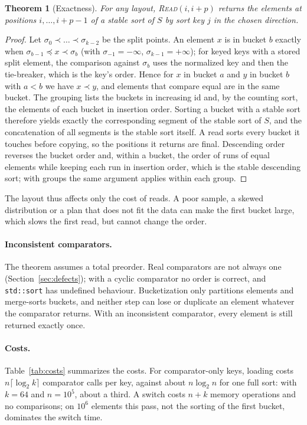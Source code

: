 \documentclass[11pt]{article}
\newtheorem{theorem}{Theorem}
\theoremstyle{definition}
\begin{document}
\begin{theorem}[Exactness]
For any layout, \textsc{Read}$(i, i+p)$ returns the elements at positions
$i,\dots,i+p-1$ of a stable sort of $S$ by sort key $j$ in the chosen
direction.
\end{theorem}
\begin{proof}
Let $\sigma_0 \prec \dots \prec \sigma_{k-2}$ be the split points. An element
$x$ is in bucket $b$ exactly when $\sigma_{b-1} \preceq x \prec \sigma_b$
(with $\sigma_{-1} = -\infty$, $\sigma_{k-1} = +\infty$); for keyed keys with a
stored split element, the comparison against $\sigma_b$ uses the normalized
key and then the tie-breaker, which is the key's order. Hence for $x$ in bucket
$a$ and $y$ in bucket $b$ with $a < b$ we have $x \prec y$, and elements that
compare equal are in the same bucket. The grouping lists the buckets in
increasing id and, by the counting sort, the elements of each bucket in
insertion order. Sorting a bucket with a stable sort therefore yields exactly
the corresponding segment of the stable sort of $S$, and the concatenation of
all segments is the stable sort itself. A read sorts every bucket it touches
before copying, so the positions it returns are final. Descending order
reverses the bucket order and, within a bucket, the order of runs of equal
elements while keeping each run in insertion order, which is the stable
descending sort; with groups the same argument applies within each group.
\end{proof}

The layout thus affects only the cost of reads. A poor sample, a skewed
distribution or a plan that does not fit the data can make the first bucket
large, which slows the first read, but cannot change the order.

\paragraph{Inconsistent comparators.} The theorem assumes a total preorder.
Real comparators are not always one (Section~\ref{sec:defects}); with a
cyclic comparator no order is correct, and \texttt{std::sort} has undefined
behaviour. Bucketization only partitions elements and merge-sorts buckets, and
neither step can lose or duplicate an element whatever the comparator returns.
With an inconsistent comparator, every element is still returned exactly once.

\paragraph{Costs.} Table~\ref{tab:costs} summarizes the costs. For comparator-only
keys, loading costs $n \lceil \log_2 k \rceil$ comparator calls per key, against
about $n \log_2 n$ for one full sort: with $k = 64$ and $n = 10^5$, about a third.
A switch costs $n + k$ memory operations and no comparisons; on $10^6$
elements this pass, not the sorting of the first bucket, dominates the
switch time.
\end{document}
